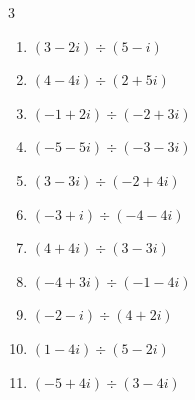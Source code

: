 \begin{multicols}{3}
\begin{enumerate}

  \item $\displaystyle (3-2i)\div(5-i)$


\columnbreak %

  \item $\displaystyle (4-4i)\div(2+5i)$


  \item $\displaystyle (-1+2i)\div(-2+3i)$


  \item $\displaystyle (-5-5i)\div(-3-3i)$


  \item $\displaystyle (3-3i)\div(-2+4i)$


  \item $\displaystyle (-3+i)\div(-4-4i)$


  \item $\displaystyle (4+4i)\div(3-3i)$


  \item $\displaystyle (-4+3i)\div(-1-4i)$


  \item $\displaystyle (-2-i)\div(4+2i)$


  \item $\displaystyle (1-4i)\div(5-2i)$


  \item $\displaystyle (-5+4i)\div(3-4i)$



\end{enumerate}
\end{multicols}

